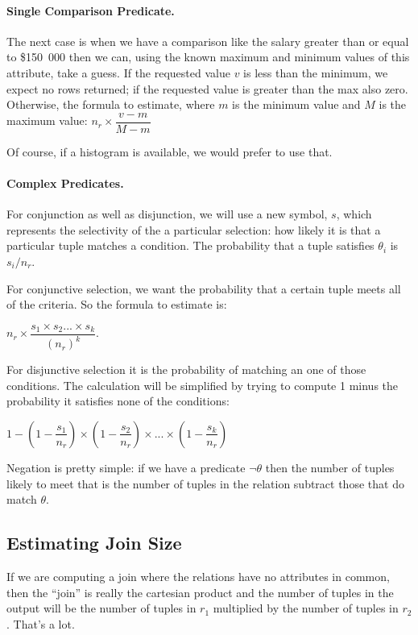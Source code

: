 \paragraph{Single Comparison Predicate.} 
The next case is when we have a comparison like the salary greater than or equal to \$150~000 then we can, using the known maximum and minimum values of this attribute, take a guess. If the requested value $v$ is less than the minimum, we expect no rows returned; if the requested value is greater than the max also zero. Otherwise, the formula to estimate, where $m$ is the minimum value and $M$ is the maximum value: $n_{r} \times \dfrac{v - m}{M - m}$

Of course, if a histogram is available, we would prefer to use that. 

\paragraph{Complex Predicates.}
For conjunction as well as disjunction, we will use a new symbol, $s$, which represents the selectivity of the a particular selection: how likely it is that a particular tuple matches a condition. The probability that a tuple satisfies $\theta_{i}$ is $s_{i}/n_{r}$.

For conjunctive selection, we want the probability that a certain tuple meets all of the criteria. So the formula to estimate is:

$n_{r} \times \dfrac{s_{1} \times s_{2}... \times s_{k}}{(n_{r})^{k}}$.

For disjunctive selection it is the probability of matching an one of those conditions. The calculation will be simplified by trying to compute 1 minus the probability it satisfies none of the conditions: 

$1 - (1 - \dfrac{s_{1}}{n_{r}}) \times (1 - \dfrac{s_{2}}{n_{r}}) \times ... \times (1 - \dfrac{s_{k}}{n_{r}})$

Negation is pretty simple: if we have a predicate $\neg\theta$ then the number of tuples likely to meet that is the number of tuples in the relation subtract those that do match $\theta$.

\subsection*{Estimating Join Size}

If we are computing a join where the relations have no attributes in common, then the ``join'' is really the cartesian product and the number of tuples in the output will be the number of tuples in $r_{1}$ multiplied by the number of tuples in $r_{2}$. That's a lot.

